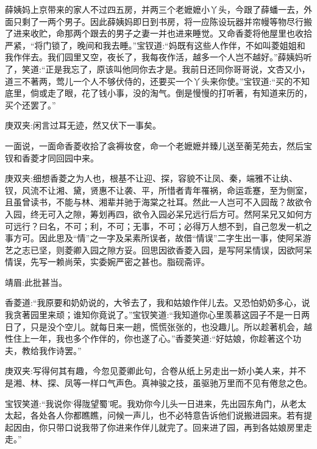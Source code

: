 \begin{parag}
    薛姨妈上京带来的家人不过四五房，并两三个老嬷嬷小丫头，今跟了薛蟠一去，外面只剩了一两个男子。因此薛姨妈即日到书房，将一应陈设玩器并帘幔等物尽行搬了进来收贮，命那两个跟去的男子之妻一并也进来睡觉。又命香菱将他屋里也收拾严紧，“将门锁了，晚间和我去睡。”宝钗道:“妈既有这些人作伴，不如叫菱姐姐和我作伴去。我们园里又空，夜长了，我每夜作活，越多一个人岂不越好。”薛姨妈听了，笑道:“正是我忘了，原该叫他同你去才是。我前日还同你哥哥说，文杏又小，道三不著两，莺儿一个人不够伏侍的，还要买一个丫头来你使。”宝钗道:“买的不知底里，倘或走了眼，花了钱小事，没的淘气。倒是慢慢的打听著，有知道来历的，买个还罢了。”\begin{note}庚双夹:闲言过耳无迹，然又伏下一事矣。\end{note}一面说，一面命香菱收拾了衾褥妆奁，命一个老嬷嬷并臻儿送至蘅芜苑去，然后宝钗和香菱才同回园中来。\begin{note}庚双夹:细想香菱之为人也，根基不让迎、探，容貌不让凤、秦，端雅不让纨、钗，风流不让湘、黛，贤惠不让袭、平，所惜者青年罹祸，命运乖蹇，至为侧室，且虽曾读书，不能与林、湘辈并驰于海棠之社耳。然此一人岂可不入园哉？故欲令入园，终无可入之隙，筹划再四，欲令入园必呆兄远行后方可。然阿呆兄又如何方可远行？曰名，不可；利，不可；无事，不可；必得万人想不到，自己忽发一机之事方可。因此思及“情”之一字及呆素所误者，故借“情误”二字生出一事，使阿呆游艺之志已坚，则菱卿入园之隙方妥。回思因欲香菱入园，是写阿呆情误，因欲阿呆情误，先写一赖尚荣，实委婉严密之甚也。脂砚斋评。\end{note}\begin{note}靖眉:此批甚当。\end{note}
\end{parag}


\begin{parag}
    香菱道:“我原要和奶奶说的，大爷去了，我和姑娘作伴儿去。又恐怕奶奶多心，说我贪著园里来顽；谁知你竟说了。”宝钗笑道:“我知道你心里羡慕这园子不是一日两日了，只是没个空儿。就每日来一趟，慌慌张张的，也没趣儿。所以趁著机会，越性住上一年，我也多个作伴的，你也遂了心。”香菱笑道:“好姑娘，你趁著这个功夫，教给我作诗罢。”\begin{note}庚双夹:写得何其有趣，今忽见菱卿此句，合卷从纸上另走出一娇小美人来，并不是湘、林、探、凤等一样口气声色。真神骏之技，虽驱驰万里而不见有倦怠之色。\end{note}宝钗笑道:“我说你‘得陇望蜀’呢。我劝你今儿头一日进来，先出园东角门，从老太太起，各处各人你都瞧瞧，问候一声儿，也不必特意告诉他们说搬进园来。若有提起因由，你只带口说我带了你进来作伴儿就完了。回来进了园，再到各姑娘房里走走。”
\end{parag}


